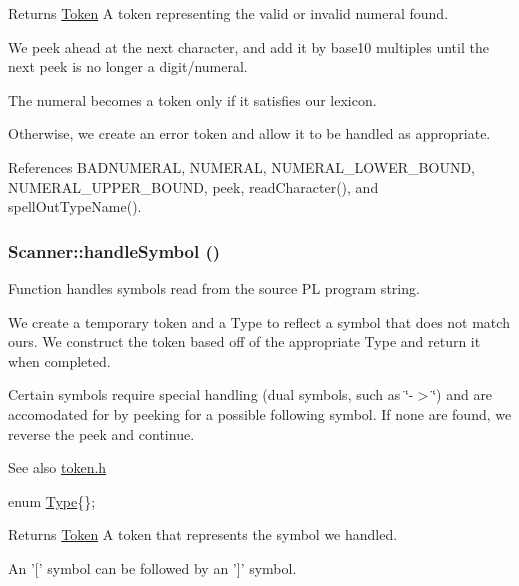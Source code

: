 \begin{DoxyReturn}{Returns}
\hyperlink{classToken}{Token} A token representing the valid or invalid numeral found. 
\end{DoxyReturn}


We peek ahead at the next character, and add it by base10 multiples until the next peek is no longer a digit/numeral.

The numeral becomes a token only if it satisfies our lexicon.

Otherwise, we create an error token and allow it to be handled as appropriate. 



References BADNUMERAL, NUMERAL, NUMERAL\_\-LOWER\_\-BOUND, NUMERAL\_\-UPPER\_\-BOUND, peek, readCharacter(), and spellOutTypeName().

\hypertarget{classScanner_a245e35355ef6e5e9206faa99f3ddc9d5}{
\subsubsection[{handleSymbol}]{ Scanner::handleSymbol ()}}
\label{classScanner_a245e35355ef6e5e9206faa99f3ddc9d5}


Function handles symbols read from the source PL program string. 

We create a temporary token and a Type to reflect a symbol that does not match ours. We construct the token based off of the appropriate Type and return it when completed.

Certain symbols require special handling (dual symbols, such as \char`\"{}-\/$>$\char`\"{}) and are accomodated for by peeking for a possible following symbol. If none are found, we reverse the peek and continue.

\begin{DoxySeeAlso}{See also}
\hyperlink{token_8h}{token.h} 

enum \hyperlink{token_8h_a1d1cfd8ffb84e947f82999c682b666a7}{Type}\{\}; 
\end{DoxySeeAlso}
\begin{DoxyReturn}{Returns}
\hyperlink{classToken}{Token} A token that represents the symbol we handled. 
\end{DoxyReturn}


An '\mbox{[}' symbol can be followed by an '\mbox{]}' symbol.

